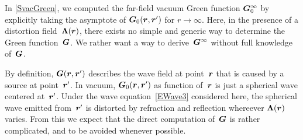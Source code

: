 In \cref{SvacGreen}, we computed the far-field vacuum Green function $\bm{G}_0^\infty$
by explicitly taking the asymptote of $\bm{G}_0(\bm{r},\bm{r}')$ for $r\to\infty$.
Here, in the presence of a distortion field~$\bm{\Lambda}(\bm{r})$,
there exists no simple and generic way to determine the Green function~$\bm{G}$.
We rather want a way to derive~$\bm{G}^\infty$ without full knowledge of~$\bm{G}$.

By definition, $\bm{G}(\bm{r},\bm{r}')$ describes the wave field at point~$\bm{r}$
that is caused by a source at point~$\bm{r}'$.
In vacuum,
$\bm{G}_0(\bm{r},\bm{r}')$ as function of~$\bm{r}$
is just a spherical wave centered at~$\bm{r}'$.
Under the wave equation~\cref{EWave3} considered here,
the spherical wave emitted from~$\bm{r}'$
is distorted by refraction and reflection whereever $\bm{\Lambda}(\bm{r})$ varies.
From this we expect that the direct computation of~$\bm{G}$
is rather complicated, and to be avoided whenever possible.


